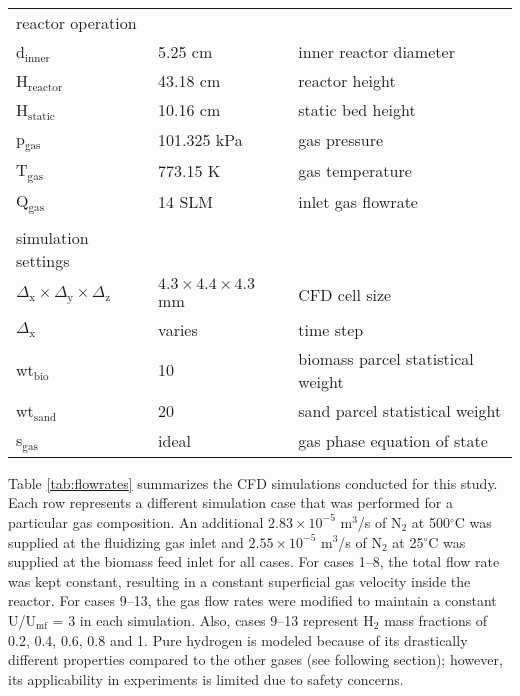 \begin{table}[H]
\begin{tabular}{lll}
        \\
        reactor operation \\
        d$_\text{inner}$      & 5.25 cm       & inner reactor diameter \\
        H$_\text{reactor}$    & 43.18 cm      & reactor height \\
        H$_\text{static}$     & 10.16 cm      & static bed height \\
        p$_\text{gas}$        & 101.325 kPa   & gas pressure \\
        T$_\text{gas}$        & 773.15 K      & gas temperature \\
        Q$_\text{gas}$        & 14 SLM        & inlet gas flowrate \\
        \\
        simulation settings \\
        $\Delta_\text{x} \times \Delta_\text{y} \times \Delta_\text{z}$ & $4.3 \times 4.4 \times 4.3$ mm & CFD cell size \\
        $\Delta_\text{x}$   & varies & time step \\
        wt$_\text{bio}$      & 10     & biomass parcel statistical weight \\
        wt$_\text{sand}$     & 20     & sand parcel statistical weight \\
        s$_\text{gas}$               & ideal  & gas phase equation of state \\
        \bottomrule
    \end{tabular}
\end{table}

Table \ref{tab:flowrates} summarizes the CFD simulations conducted for this study. Each row represents a different simulation case that was performed for a particular gas composition. An additional $2.83\times10^{-5}$ m$^3$/s of N$_2$ at 500$^\circ$C was supplied at the fluidizing gas inlet and $2.55\times10^{-5}$ m$^3$/s of N$_2$ at 25$^\circ$C was supplied at the biomass feed inlet for all cases. For cases 1--8, the total flow rate was kept constant, resulting in a constant superficial gas velocity inside the reactor. For cases 9--13, the gas flow rates were modified to maintain a constant U/U$_\text{mf}$ = 3 in each simulation. Also, cases 9--13 represent H$_2$ mass fractions of 0.2, 0.4, 0.6, 0.8 and 1. Pure hydrogen is modeled because of its drastically different properties compared to the other gases (see following section); however, its applicability in experiments is limited due to safety concerns.

